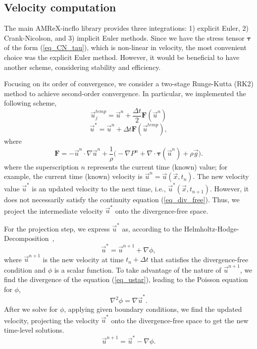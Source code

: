 \subsection{Velocity computation}
The main AMReX-incflo library provides three integrations: 1) explicit Euler, 2) Crank-Nicolson, and 3) implicit Euler methods. 
Since we have the stress tensor ${\bm \tau}$ of the form (\ref{eq_CN_tau}), which is non-linear in velocity, the most convenient choice was the explicit Euler method.
 However, it would be beneficial to have another scheme, considering stability and efficiency. 
 \par
 Focusing on its order of convergence, we consider a two-stage Runge-Kutta (RK2) method to achieve second-order convergence. 
In particular, we implemented the following scheme,
\begin{equation}
	\vec{u}_{j}^{temp} = \vec{u}^{n} + \frac{\Delta t}{2} {\bm F} \left( \vec{u}^{n} \right)
	\label{eq_RK2_s1} 
\end{equation}
\begin{equation}
	\vec{u}^{*} = \vec{u}^{n} + \Delta t {\bm F} \left( \vec{u}^{temp} \right),
	\label{eq_RK2_s2}
\end{equation}
where 
\[
  {\bm F} = 
    -\vec{u}^n \cdot \nabla \vec{u}^n 
    +\frac{1}{\rho}
    \biggl(
    - \nabla P^n 
        + \nabla \cdot   \bm{\tau}(\vec{u}^n)
        +  \rho  \vec{g} 
        \biggr).
\]
where the superscription $n$ represents the current time (known) value; for example, the current time (known) velocity is $\vec{u}^n = \vec{u}(\vec{x}, t_n)$. The new velocity value $\vec{u}^*$ is an updated velocity to the next time, i.e., $\vec{u}^* (\vec{x}, t_{n+1})$. However, it does not necessarily satisfy the continuity equation (\ref{eq_div_free}). Thus, we project the intermediate velocity $\vec{u}^*$ onto the divergence-free space. 
\par
For the projection step, we express $\vec{u}^{*}$ as, according to the Helmholtz-Hodge-Decomposition~\cite{chorin_mathematical_1993}, 
\begin{equation}
  \vec{u}^* = \vec{u}^{n+1} + \nabla \phi,
  \label{eq_ustar}
\end{equation}
where $\vec{u}^{n+1}$ is the new velocity at time $t_n + \Delta t$ that satisfies the divergence-free condition and $\phi$ is a scalar function.
To take advantage of the nature of $\vec{u}^{n+1}$, we find the divergence of the equation (\ref{eq_ustar}), leading to the Poisson equation for $\phi$,
\[
  \nabla^2 \phi = \nabla \vec{u}^*.  
\]
After we solve for $\phi$, applying given boundary conditions, we find the updated velocity, projecting the velocity $\vec{u}^*$ onto the divergence-free space to get the new time-level solutions.
\[
  \vec{u}^{n+1} = \vec{u}^* - \nabla \phi.
\]
